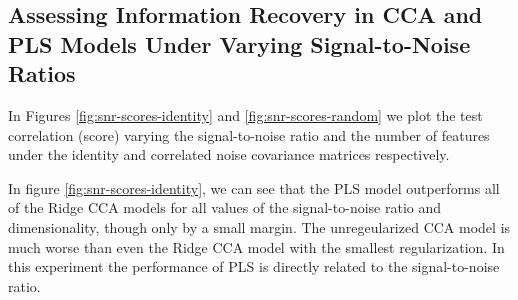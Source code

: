 %
%


\subsection{Assessing Information Recovery in CCA and PLS Models Under Varying Signal-to-Noise Ratios}

In Figures \ref{fig:snr-scores-identity} and \ref{fig:snr-scores-random} we plot the test correlation (score) varying the signal-to-noise ratio and the number of features under the identity and correlated noise covariance matrices respectively.

In figure \ref{fig:snr-scores-identity}, we can see that the PLS model outperforms all of the Ridge CCA models for all values of the signal-to-noise ratio and dimensionality, though only by a small margin.
The unregeularized CCA model is much worse than even the Ridge CCA model with the smallest regularization.
In this experiment the performance of PLS is directly related to the signal-to-noise ratio.

